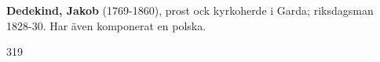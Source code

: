 \textbf{Dedekind, Jakob} (1769-1860), prost ock kyrkoherde i Garda; riksdagsman 1828-30. Har även komponerat en polska.

319 
